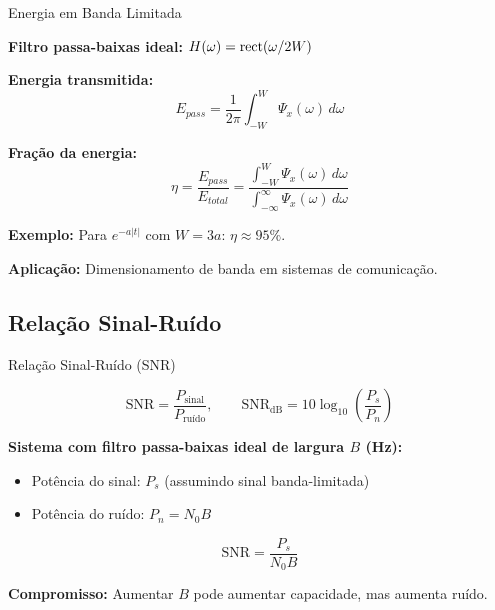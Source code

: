 
\begin{frame}{Energia em Banda Limitada}

\textbf{Filtro passa-baixas ideal:} $H(\omega) = \text{rect}(\omega/2W)$

\textbf{Energia transmitida:}
\[
E_{pass} = \frac{1}{2\pi} \int_{-W}^{W} \Psi_x(\omega)\, d\omega
\]

\textbf{Fração da energia:}
\[
\eta = \frac{E_{pass}}{E_{total}} = \frac{\int_{-W}^{W} \Psi_x(\omega)\, d\omega}{\int_{-\infty}^{\infty} \Psi_x(\omega)\, d\omega}
\]

\textbf{Exemplo:} Para $e^{-a|t|}$ com $W = 3a$: $\eta \approx 95\%$.

\textbf{Aplicação:} Dimensionamento de banda em sistemas de comunicação.

\end{frame}

\subsection{Relação Sinal-Ruído}

\begin{frame}{Relação Sinal-Ruído (SNR)}

\[
\text{SNR} = \frac{P_{\text{sinal}}}{P_{\text{ruído}}}, \qquad \text{SNR}_{\text{dB}} = 10\log_{10}\!\left(\frac{P_s}{P_n}\right)
\]

\textbf{Sistema com filtro passa-baixas ideal de largura $B$ (Hz):}

\begin{itemize}
\item Potência do sinal: $P_s$ (assumindo sinal banda-limitada)
\item Potência do ruído: $P_n = N_0 B$
\end{itemize}

\[
\text{SNR} = \frac{P_s}{N_0 B}
\]

\textbf{Compromisso:} Aumentar $B$ pode aumentar capacidade, mas aumenta ruído.

\end{frame}


